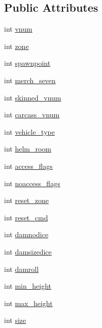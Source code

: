 \subsection*{Public Attributes}
\begin{DoxyCompactItemize}
\item 
int \hyperlink{structmob__data_a7803adf80bb5d19a5cf16f226c7937c9}{vnum}
\item 
int \hyperlink{structmob__data_a6c0272e45a40961b383f3913fb76bcb2}{zone}
\item 
int \hyperlink{structmob__data_a7ebdf3e3b5320a066d155298338a92cd}{spawnpoint}
\item 
int \hyperlink{structmob__data_aa167ffc7dba76b0860233fefa51b09d5}{merch\-\_\-seven}
\item 
int \hyperlink{structmob__data_a404ccb7c7a78f9bf85638aacb52a072b}{skinned\-\_\-vnum}
\item 
int \hyperlink{structmob__data_a3e43c21ad25dc948d46ab4116a0eb0f8}{carcass\-\_\-vnum}
\item 
int \hyperlink{structmob__data_a92df83a2ca69ac3c6cf0cdb2f50d3d6f}{vehicle\-\_\-type}
\item 
int \hyperlink{structmob__data_ac79029623485ff84bc9460d1eef1ce25}{helm\-\_\-room}
\item 
int \hyperlink{structmob__data_adc1eb40f9106426531703413f3640837}{access\-\_\-flags}
\item 
int \hyperlink{structmob__data_aede04c55a464b29266b8867893c1c766}{noaccess\-\_\-flags}
\item 
int \hyperlink{structmob__data_a7e514a4bbbc622af03b68918e790a57d}{reset\-\_\-zone}
\item 
int \hyperlink{structmob__data_a0b2e68d366bff87201985e2d8072c889}{reset\-\_\-cmd}
\item 
int \hyperlink{structmob__data_a75d005ecbdff926e58863be38aca1794}{damnodice}
\item 
int \hyperlink{structmob__data_a225fdb99418302d385ec232a8e8e31d0}{damsizedice}
\item 
int \hyperlink{structmob__data_aba7f229aab599659de17b09682920692}{damroll}
\item 
int \hyperlink{structmob__data_a59f10a7a67a698adf2651dc0b415201e}{min\-\_\-height}
\item 
int \hyperlink{structmob__data_a8b7190595f3039c82c6362499f37cbf8}{max\-\_\-height}
\item 
int \hyperlink{structmob__data_a5b571030e4e126ebfb8d635d578d64df}{size}
\item 

\end{DoxyCompactItemize}
